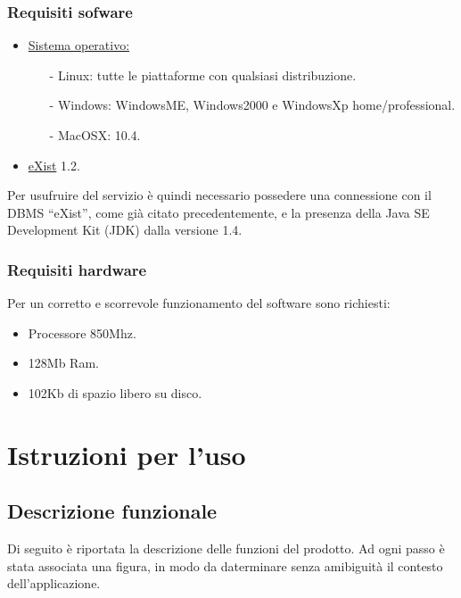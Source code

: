\subsection{Requisiti sofware}
\begin{itemize}
\item \underline{Sistema operativo:}
\begin{itemize}
\item[-] Linux: tutte le piattaforme con qualsiasi distribuzione.
\item[-] Windows: WindowsME, Windows2000 e WindowsXp home/professional.
\item[-] MacOSX: 10.4.
\end{itemize}
\item \underline{eXist} 1.2.
\end{itemize}
Per usufruire del servizio \`e quindi necessario possedere una connessione con il DBMS ``eXist'', come gi\`a citato precedentemente, e la presenza della Java SE Development Kit (JDK) dalla versione 1.4.
\subsection{Requisiti hardware}
Per un corretto e scorrevole funzionamento del software sono richiesti:
\begin{itemize}
\item Processore 850Mhz.
\item 128Mb Ram.
\item 102Kb di spazio libero su disco.
\end{itemize}

\chapter{Istruzioni per l'uso}
\section{Descrizione funzionale}
Di seguito \`e riportata la descrizione delle funzioni del prodotto. Ad ogni passo \`e stata associata una figura, in modo da daterminare senza amibiguit\`a il contesto dell'applicazione.
